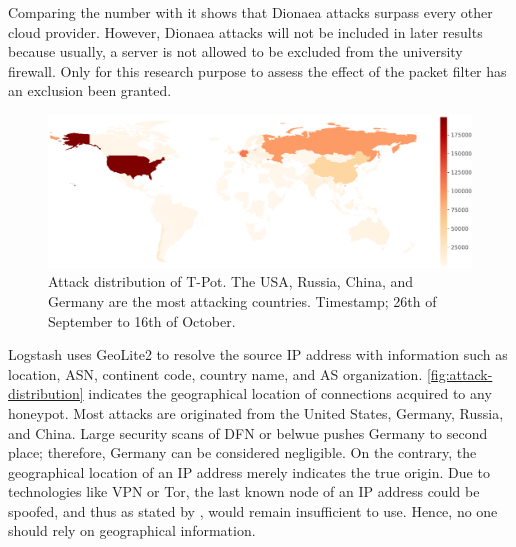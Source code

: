 Comparing the number with \citet{Kelly2021} it shows that Dionaea attacks surpass every other cloud provider.
However, Dionaea attacks will not be included in later results because usually, a server is not allowed to be excluded from the university firewall.
Only for this research purpose to assess the effect of the packet filter has an exclusion been granted.

\begin{figure}
    \centering
    \includegraphics[width=\textwidth]{figures/tpot-overview-map.pdf}
    \caption[Attack distribution of T-Pot]{
        Attack distribution of T-Pot.
        The USA, Russia, China, and Germany are the most attacking countries.
        Timestamp; 26th of September to 16th of October.
    }
    \label{fig:attack-distribution}
\end{figure}

Logstash uses GeoLite2 to resolve the source IP address with information such as location, ASN, continent code, country name, and AS organization.
\autoref{fig:attack-distribution} indicates the geographical location of connections acquired to any honeypot.
Most attacks are originated from the United States, Germany, Russia, and China.
Large security scans of DFN or \ac{belwue} pushes Germany to second place; therefore, Germany can be considered negligible.
On the contrary, the geographical location of an IP address merely indicates the true origin.
Due to technologies like VPN or Tor, the last known node of an IP address could be spoofed, and thus as stated by \citet{Kelly2021}, would remain insufficient to use.
Hence, no one should rely on geographical information.

